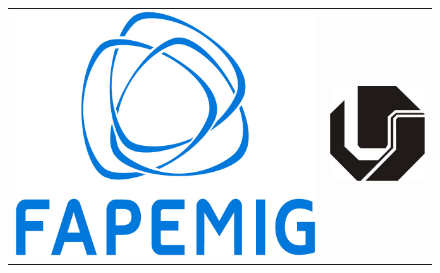 \documentclass[xcolor=dvipsnames,8pt,aspectratio=34]{beamer}
\begin{document}
\begin{frame}
\begin{minipage}[h!]{0.47\textwidth}
\begin{figure}
\begin{center}
\begin{tabular}{c c}
							{\includegraphics[trim=0.0cm 0.0cm 0.0cm 0.0cm,clip=true,height=0.2\textheight]{figuras/FAPEMIG.jpg}}&{\includegraphics[trim=0.0cm 0.0cm 0.0cm 0.0cm,clip=true,height=0.2\textheight]{figuras/UFU_black.jpg}}\\
						\end{tabular}
					\end{center}
				\end{figure}
				\end{minipage}
			\end{frame}
			
			
			
			
			
\end{document}

